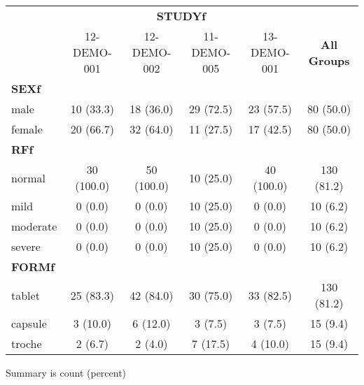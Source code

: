 \setlength{\tabcolsep}{5pt} 
\begin{threeparttable}
\renewcommand{\arraystretch}{1.3}
\begin{tabular}[h]{lccccc}
\hline
\multicolumn{1}{c}{} & \multicolumn{4}{c}{\textbf{STUDYf}} & \multicolumn{1}{c}{}\\
\cmidrule(lr){2-5}
\ & 12-DEMO-001 & 12-DEMO-002 & 11-DEMO-005 & 13-DEMO-001 & \textbf{All Groups} \\
\hline
\multicolumn{6}{l}{\textbf{SEXf}}\\
male & 10 (33.3) & 18 (36.0) & 29 (72.5) & 23 (57.5) & 80 (50.0) \\
female & 20 (66.7) & 32 (64.0) & 11 (27.5) & 17 (42.5) & 80 (50.0) \\
\hline \multicolumn{6}{l}{\textbf{RFf}}\\
normal & 30 (100.0) & 50 (100.0) & 10 (25.0) & 40 (100.0) & 130 (81.2) \\
mild & 0 (0.0) & 0 (0.0) & 10 (25.0) & 0 (0.0) & 10 (6.2) \\
moderate & 0 (0.0) & 0 (0.0) & 10 (25.0) & 0 (0.0) & 10 (6.2) \\
severe & 0 (0.0) & 0 (0.0) & 10 (25.0) & 0 (0.0) & 10 (6.2) \\
\hline \multicolumn{6}{l}{\textbf{FORMf}}\\
tablet & 25 (83.3) & 42 (84.0) & 30 (75.0) & 33 (82.5) & 130 (81.2) \\
capsule & 3 (10.0) & 6 (12.0) & 3 (7.5) & 3 (7.5) & 15 (9.4) \\
troche & 2 (6.7) & 2 (4.0) & 7 (17.5) & 4 (10.0) & 15 (9.4) \\
\hline
\end{tabular}
\begin{tablenotes}[flushleft]
\item Summary is count (percent)
\end{tablenotes}
\end{threeparttable}
